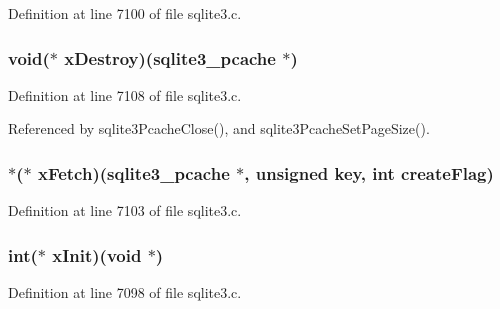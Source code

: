 Definition at line 7100 of file sqlite3.\+c.

\hypertarget{structsqlite3__pcache__methods2_ac818e6091765fe201ab5727d515141a7}{}
\subsubsection[{x\+Destroy}]{\setlength{\rightskip}{0pt plus 5cm}void($\ast$ x\+Destroy)({\bf sqlite3\+\_\+pcache} $\ast$)}\label{structsqlite3__pcache__methods2_ac818e6091765fe201ab5727d515141a7}


Definition at line 7108 of file sqlite3.\+c.



Referenced by sqlite3\+Pcache\+Close(), and sqlite3\+Pcache\+Set\+Page\+Size().

\hypertarget{structsqlite3__pcache__methods2_a7353726473e016e2920a8c1c5821f495}{}
\subsubsection[{x\+Fetch}]{ $\ast$($\ast$ x\+Fetch)({\bf sqlite3\+\_\+pcache} $\ast$, unsigned key, int create\+Flag)}\label{structsqlite3__pcache__methods2_a7353726473e016e2920a8c1c5821f495}


Definition at line 7103 of file sqlite3.\+c.

\hypertarget{structsqlite3__pcache__methods2_a707c4748dcafc75384a806d13bb68bdd}{}
\subsubsection[{x\+Init}]{\setlength{\rightskip}{0pt plus 5cm}int($\ast$ x\+Init)(void $\ast$)}\label{structsqlite3__pcache__methods2_a707c4748dcafc75384a806d13bb68bdd}


Definition at line 7098 of file sqlite3.\+c.



